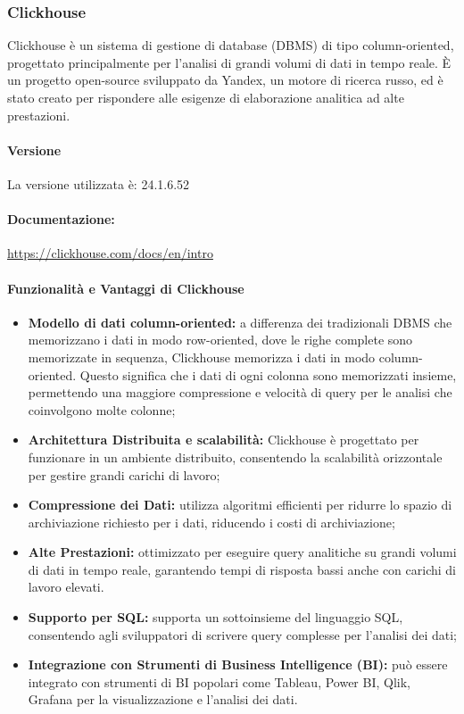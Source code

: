 \subsubsection{Clickhouse} \label{sec:clickHouse}
Clickhouse è un sistema di gestione di database (DBMS) di tipo column-oriented, progettato principalmente per l'analisi di grandi volumi di dati in tempo reale. È un progetto open-source sviluppato da Yandex, un motore di ricerca russo, ed è stato creato per rispondere alle esigenze di elaborazione analitica ad alte prestazioni.
\paragraph{Versione}
La versione utilizzata è: 24.1.6.52
\paragraph{Documentazione:}
\href{https://clickhouse.com/docs/en/intro}{https://clickhouse.com/docs/en/intro}

\paragraph{Funzionalità e Vantaggi di Clickhouse}
\begin{itemize}
    \item \textbf{ Modello di dati column-oriented:} a differenza dei tradizionali DBMS che memorizzano i dati in modo row-oriented, dove le righe complete sono memorizzate in sequenza, Clickhouse memorizza i dati in modo column-oriented. Questo significa che i dati di ogni colonna sono memorizzati insieme, permettendo una maggiore compressione e velocità di query per le analisi che coinvolgono molte colonne;
    \item \textbf{Architettura Distribuita e scalabilità:} Clickhouse è progettato per funzionare in un ambiente distribuito, consentendo la scalabilità orizzontale per gestire grandi carichi di lavoro;
    \item \textbf{Compressione dei Dati:} utilizza algoritmi efficienti per ridurre lo spazio di archiviazione richiesto per i dati, riducendo i costi di archiviazione;
    \item \textbf{Alte Prestazioni:} ottimizzato per eseguire query analitiche su grandi volumi di dati in tempo reale, garantendo tempi di risposta bassi anche con carichi di lavoro elevati.
    \item \textbf{Supporto per SQL:} supporta un sottoinsieme del linguaggio SQL, consentendo agli sviluppatori di scrivere query complesse per l'analisi dei dati;
    \item \textbf{Integrazione con Strumenti di Business Intelligence (BI):} può essere integrato con strumenti di BI popolari come Tableau, Power BI, Qlik, Grafana per la visualizzazione e l'analisi dei dati.
\end{itemize}


